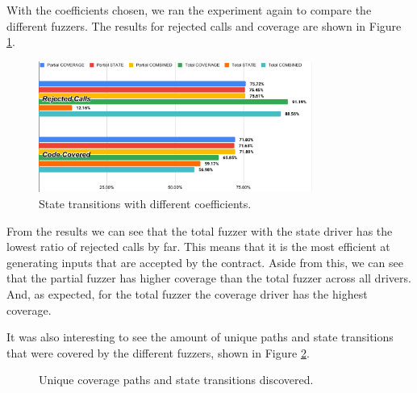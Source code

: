 With the coefficients chosen, we ran the experiment again to compare the different fuzzers.
The results for rejected calls and coverage are shown in Figure \ref{fig:rej-cov}.

\begin{figure}[htbp]
    \centering
    \includegraphics[width=0.8\textwidth]{charts/rej-cov.pdf}
    \caption{State transitions with different coefficients.}\label{fig:rej-cov}
\end{figure}

From the results we can see that the total fuzzer with the state driver has the lowest ratio of rejected calls by far.
This means that it is the most efficient at generating inputs that are accepted by the contract.
Aside from this, we can see that the partial fuzzer has higher coverage than the total fuzzer across all drivers.
And, as expected, for the total fuzzer the coverage driver has the highest coverage.

It was also interesting to see the amount of unique paths and state transitions that were covered by the different fuzzers, shown in Figure \ref{fig:path-trans}.


\begin{figure}[!htbp]
    \centering
    \hfill
    \caption{Unique coverage paths and state transitions discovered.}
    \label{fig:path-trans}
\end{figure}


